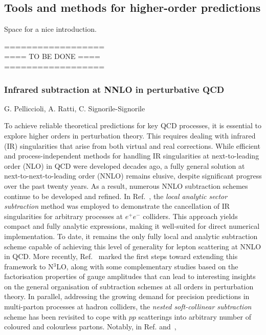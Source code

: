 \documentclass{FBR_Bericht_2025}
\begin{document}
\subsection{Tools and methods for higher-order predictions}
\begin{refsection}
Space for a nice introduction.

%
{\color{red} ==================\\ ====\; TO BE DONE\; ====\\ ==================}
%
\subsubsection{Infrared subtraction at NNLO in perturbative QCD}
\begin{Namen}
G. Pelliccioli, A. Ratti, C. Signorile-Signorile
\end{Namen}
%
To achieve reliable theoretical predictions for key QCD processes, it is essential to explore higher orders in perturbation theory. This requires dealing with infrared (IR) singularities that arise from both virtual and real corrections. While efficient and process-independent methods for handling IR singularities at next-to-leading order (NLO) in QCD were developed decades ago, a fully general solution at next-to-next-to-leading order (NNLO) remains elusive, despite significant progress over the past twenty years.
As a result, numerous NNLO subtraction schemes continue to be developed and refined. In Ref.~\cite{Bertolotti:2022aih}, the \emph{local analytic sector subtraction} method was employed to demonstrate the cancellation of IR singularities for arbitrary processes at $e^+e^-$ colliders. This approach yields compact and fully analytic expressions, making it well-suited for direct numerical implementation. To date, it remains the only fully local and analytic subtraction scheme capable of achieving this level of generality for lepton scattering at NNLO in QCD.
More recently, Ref.~\cite{Magnea:2024jqg} marked the first steps toward extending this framework to N${}^3$LO, along with some complementary studies based on the factorisation properties of gauge amplitudes that can lead to interesting insights on the general organisation of subtraction schemes at all orders in perturbation theory.
In parallel, addressing the growing demand for precision predictions in multi-parton processes at hadron colliders, the \emph{nested soft-collinear subtraction} scheme has been revisited to cope with $pp$ scatterings into arbitrary number of coloured and colourless partons. Notably, in Ref.\cite{Devoto:2023rpv} and~\cite{Devoto:2025kin}, 

\end{refsection}
\end{document}
